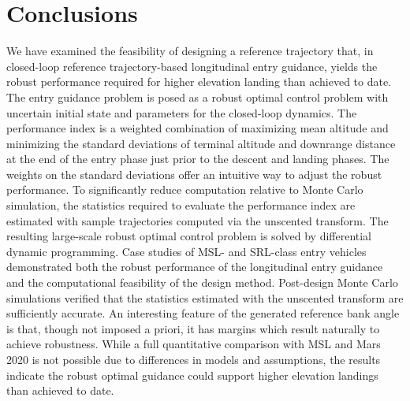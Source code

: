 \chapter{Conclusions}\label{Ch:Conclusions}


We have examined the feasibility of designing a reference trajectory that, in closed-loop reference trajectory-based longitudinal entry guidance, yields the robust performance required for higher elevation landing than achieved to date. The entry guidance problem is posed as a robust optimal control problem with uncertain initial state and parameters for the closed-loop dynamics. The performance index is a weighted combination of maximizing mean altitude and minimizing the standard deviations of terminal altitude and downrange distance at the end of the entry phase just prior to the descent and landing phases. The weights on the standard deviations offer an intuitive way to adjust the robust performance. To significantly reduce computation relative to Monte Carlo simulation, the statistics required to evaluate the performance index are estimated with sample trajectories computed via the unscented transform. The resulting large-scale robust optimal control problem is solved by differential dynamic programming. Case studies of MSL- and SRL-class entry vehicles demonstrated both the robust performance of the longitudinal entry guidance and the computational feasibility of the design method. Post-design Monte Carlo simulations verified that the statistics estimated with the unscented transform are sufficiently accurate. An interesting feature of the generated reference bank angle is that, though not imposed a priori, it has margins which result naturally to achieve robustness. While a full quantitative comparison with MSL and Mars 2020 is not possible due to differences in models and assumptions, the results indicate the robust optimal guidance could support higher elevation landings than achieved to date.

